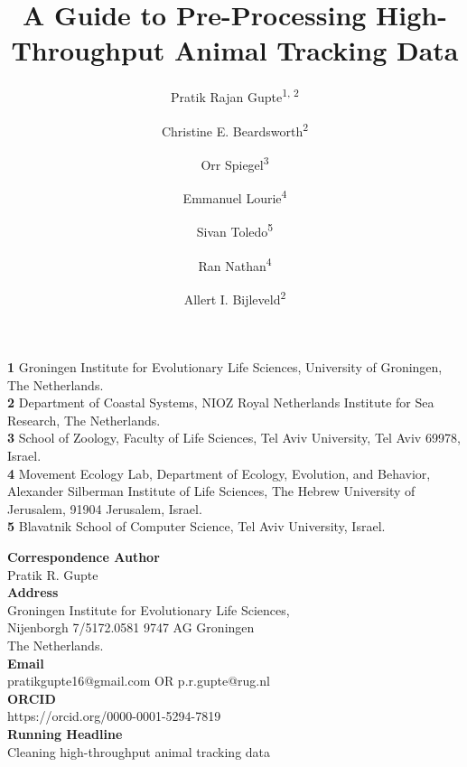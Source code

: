 \documentclass[10pt,paper=a4,headings=standardclasses
]{scrartcl}
\title{A Guide to Pre-Processing High-Throughput Animal Tracking Data}
\date{}
\author{Pratik Rajan Gupte\textsuperscript{1, 2} \and 
Christine E. Beardsworth\textsuperscript{2} \and
Orr Spiegel\textsuperscript{3} \and
Emmanuel Lourie\textsuperscript{4} \and
Sivan Toledo\textsuperscript{5} \and
Ran Nathan\textsuperscript{4} \and
Allert I. Bijleveld\textsuperscript{2}}
\begin{document}

\maketitle


\begin{flushleft}
\bigskip
\textbf{1} Groningen Institute for Evolutionary Life Sciences, University of Groningen, The Netherlands.
\\
\textbf{2} Department of Coastal Systems, NIOZ Royal Netherlands Institute for Sea Research, The Netherlands.
\\
\textbf{3} School of Zoology, Faculty of Life Sciences, Tel Aviv University, Tel Aviv 69978, Israel.
\\
\textbf{4} Movement Ecology Lab, Department of Ecology, Evolution, and Behavior, Alexander Silberman Institute of Life Sciences, The Hebrew University of Jerusalem, 91904 Jerusalem, Israel.
\\
\textbf{5} Blavatnik School of Computer Science, Tel Aviv University, Israel.
\\
\bigskip

\textbf{Correspondence Author}
\\
Pratik R. Gupte
\\
\textbf{Address}
\\
Groningen Institute for Evolutionary Life Sciences, 
\\
Nijenborgh 7/5172.0581 9747 AG Groningen
\\
The Netherlands.
\\
\textbf{Email}
\\
pratikgupte16@gmail.com OR p.r.gupte@rug.nl
\\
\textbf{ORCID}
\\
https://orcid.org/0000-0001-5294-7819
\\
\textbf{Running Headline}
\\
Cleaning high-throughput animal tracking data

\end{flushleft}

\newpage
\end{document}
